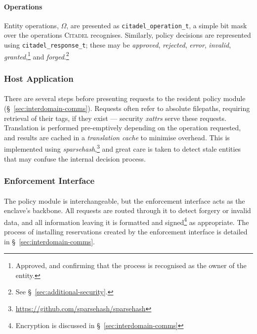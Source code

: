 \paragraph{Operations} Entity operations, $\Omega$, are presented as \texttt{citadel\_operation\_t}, a simple bit mask over the operations \textsc{Citadel} recognises. Similarly, policy decisions are represented using \texttt{citadel\_response\_t}; these may be \textit{approved}, \textit{rejected}, \textit{error}, \textit{invalid}, \textit{granted},\footnote{Approved, and confirming that the process is recognised as the owner of the entity.} and \textit{forged}.\footnote{See §~\ref{sec:additional-security}.}


\subsubsection{Host Application}

\paragraph{} There are several steps before presenting requests to the resident policy module (§~\ref{sec:interdomain-comms}). Requests often refer to absolute filepaths, requiring retrieval of their tags, if they exist --- security \textit{\acrshort{xattr}s} serve these requests. Translation is performed pre-emptively depending on the operation requested, and results are cached in a \textit{translation cache} to minimise overhead. This is implemented using \textit{sparsehash},\footnote{\url{https://github.com/sparsehash/sparsehash}} and great care is taken to detect stale entities that may confuse the internal decision process.


\subsubsection{Enforcement Interface}
\paragraph{} The policy module is interchangeable, but the enforcement interface acts as the enclave's backbone. All requests are routed through it to detect forgery or invalid data, and all information leaving it is formatted and signed\footnote{Encryption is discussed in §~\ref{sec:interdomain-comms}} as appropriate. The process of installing reservations created by the enforcement interface is detailed in §~\ref{sec:interdomain-comms}.

